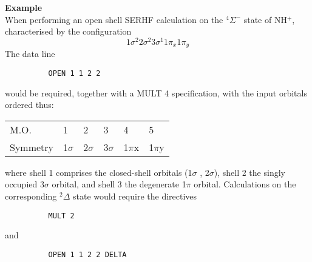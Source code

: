 \documentclass[11pt,fleqn]{article}
\begin{document}
{\bf Example}\\

When performing an open shell SERHF calculation on
the $^{4}\Sigma^{-}$ state of NH$^{+}$, 
characterised by the configuration
\begin{equation}
  1\sigma^2 2\sigma^2 3\sigma^1 1\pi_x 1\pi_y
\end{equation}
The data line
{
\footnotesize
\begin{verbatim}
          OPEN 1 1 2 2
\end{verbatim}
}
would be required, together with a MULT 4 specification, 
with the input orbitals ordered thus:

\begin{centering}
\begin {tabular}{llllll}
 M.O.     &  1 & 2 & 3 & 4 & 5 \\
 Symmetry  & 1$\sigma$ & 2$\sigma$ & 3$\sigma$ & 1$\pi$x & 1$\pi$y\\
\end{tabular}

\end{centering}

where shell 1 comprises the closed-shell orbitals (1$\sigma$ , 2$\sigma$), shell 2
the singly occupied 3$\sigma$ orbital, and shell 3 the degenerate 1$\pi$ orbital.
Calculations on the corresponding $^{2}\Delta$  state would require the
directives

{
\footnotesize
\begin{verbatim}
          MULT 2
\end{verbatim}
}
and
{
\footnotesize
\begin{verbatim}
          OPEN 1 1 2 2 DELTA
\end{verbatim}
}
\end{document}
